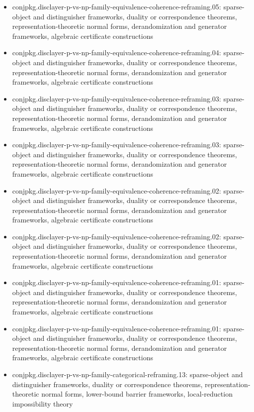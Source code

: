 \documentclass[11pt]{article}
\begin{document}
\begin{itemize}
\item conjpkg.disclayer-p-vs-np-family-equivalence-coherence-reframing.05: sparse-object and distinguisher frameworks, duality or correspondence theorems, representation-theoretic normal forms, derandomization and generator frameworks, algebraic certificate constructions
\item conjpkg.disclayer-p-vs-np-family-equivalence-coherence-reframing.04: sparse-object and distinguisher frameworks, duality or correspondence theorems, representation-theoretic normal forms, derandomization and generator frameworks, algebraic certificate constructions
\item conjpkg.disclayer-p-vs-np-family-equivalence-coherence-reframing.03: sparse-object and distinguisher frameworks, duality or correspondence theorems, representation-theoretic normal forms, derandomization and generator frameworks, algebraic certificate constructions
\item conjpkg.disclayer-p-vs-np-family-equivalence-coherence-reframing.03: sparse-object and distinguisher frameworks, duality or correspondence theorems, representation-theoretic normal forms, derandomization and generator frameworks, algebraic certificate constructions
\item conjpkg.disclayer-p-vs-np-family-equivalence-coherence-reframing.02: sparse-object and distinguisher frameworks, duality or correspondence theorems, representation-theoretic normal forms, derandomization and generator frameworks, algebraic certificate constructions
\item conjpkg.disclayer-p-vs-np-family-equivalence-coherence-reframing.02: sparse-object and distinguisher frameworks, duality or correspondence theorems, representation-theoretic normal forms, derandomization and generator frameworks, algebraic certificate constructions
\item conjpkg.disclayer-p-vs-np-family-equivalence-coherence-reframing.01: sparse-object and distinguisher frameworks, duality or correspondence theorems, representation-theoretic normal forms, derandomization and generator frameworks, algebraic certificate constructions
\item conjpkg.disclayer-p-vs-np-family-equivalence-coherence-reframing.01: sparse-object and distinguisher frameworks, duality or correspondence theorems, representation-theoretic normal forms, derandomization and generator frameworks, algebraic certificate constructions
\item conjpkg.disclayer-p-vs-np-family-categorical-reframing.13: sparse-object and distinguisher frameworks, duality or correspondence theorems, representation-theoretic normal forms, lower-bound barrier frameworks, local-reduction impossibility theory

\end{itemize}
\end{document}

